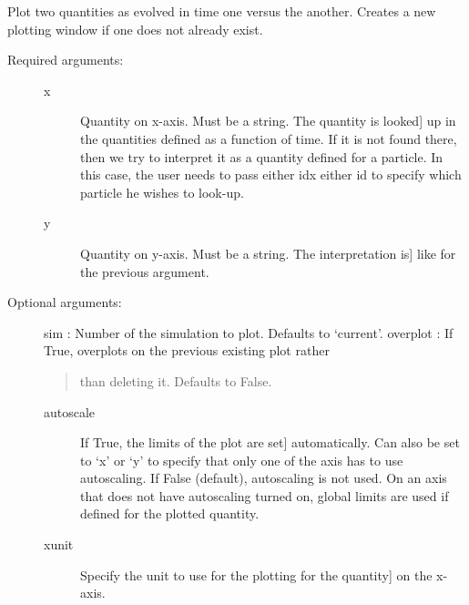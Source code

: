 \documentclass[letterpaper,10pt,english]{sphinxmanual}
\begin{document}
\begin{fulllineitems}
\label{index:facade.time_plot}
Plot two quantities as evolved in time one versus the another.  Creates
a new plotting window if one does not already exist.
\begin{description}
\item[{Required arguments:}] \leavevmode\begin{description}
\item[{x}] \leavevmode{[}Quantity on x-axis. Must be a string. The quantity is looked{]}
up in the quantities defined as a function of time. If it is
not found there, then we try to interpret it as a quantity
defined for a particle. In this case, the user needs to pass
either idx either id to specify which particle he wishes
to look-up.

\item[{y}] \leavevmode{[}Quantity on y-axis.  Must be a string. The interpretation is{]}
like for the previous argument.

\end{description}

\item[{Optional arguments:}] \leavevmode
sim        : Number of the simulation to plot. Defaults to `current'.
overplot   : If True, overplots on the previous existing plot rather
\begin{quote}

than deleting it. Defaults to False.
\end{quote}
\begin{description}
\item[{autoscale}] \leavevmode{[}If True, the limits of the plot are set{]}
automatically.  Can also be set to `x' or `y' to specify
that only one of the axis has to use autoscaling.
If False (default), autoscaling is not used. On an axis that
does not have autoscaling turned on, global limits are used
if defined for the plotted quantity.

\item[{xunit}] \leavevmode{[}Specify the unit to use for the plotting for the quantity{]}
on the x-axis.


\end{description}
\end{description}
\end{fulllineitems}
\end{document}
